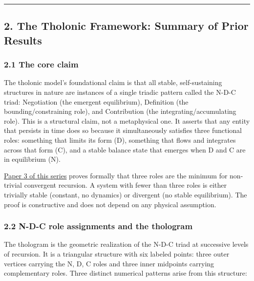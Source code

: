 \documentclass[
  11pt,
  letterpaper,
]{article}
\begin{document}
\begin{center}\rule{0.5\linewidth}{0.5pt}\end{center}

\subsection{2. The Tholonic Framework: Summary of Prior
Results}\label{the-tholonic-framework-summary-of-prior-results}

\subsubsection{2.1 The core claim}\label{the-core-claim}

The tholonic model's foundational claim is that all stable,
self-sustaining structures in nature are instances of a single triadic
pattern called the N-D-C triad: Negotiation (the emergent equilibrium),
Definition (the bounding/constraining role), and Contribution (the
integrating/accumulating role). This is a structural claim, not a
metaphysical one. It asserts that any entity that persists in time does
so because it simultaneously satisfies three functional roles: something
that limits its form (D), something that flows and integrates across
that form (C), and a stable balance state that emerges when D and C are
in equilibrium (N).

\href{https://github.com/baardev/truevalue/blob/main/docnav/Research/papers/3_minimal-recursive-triadic-framework/3_minimal-recursive-triadic-framework.pdf}{Paper
3 of this series} proves formally that three roles are the minimum for
non-trivial convergent recursion. A system with fewer than three roles
is either trivially stable (constant, no dynamics) or divergent (no
stable equilibrium). The proof is constructive and does not depend on
any physical assumption.

\subsubsection{2.2 N-D-C role assignments and the
thologram}\label{n-d-c-role-assignments-and-the-thologram}

The thologram is the geometric realization of the N-D-C triad at
successive levels of recursion. It is a triangular structure with six
labeled points: three outer vertices carrying the N, D, C roles and
three inner midpoints carrying complementary roles. Three distinct
numerical patterns arise from this structure:
\end{document}
